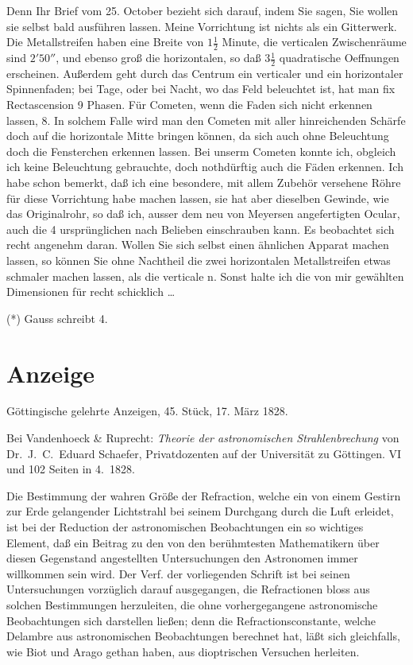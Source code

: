 \documentclass[12pt,a4paper]{article}
\theoremstyle{plain}
\theoremstyle{definition}
\theoremstyle{remark}
\begin{document}
\newpage

Denn Ihr Brief vom 25. October bezieht sich darauf, indem Sie sagen, Sie wollen sie selbst bald ausf\"uhren lassen. Meine Vorrichtung ist nichts als ein Gitterwerk. Die Metallstreifen haben eine Breite von $1\tfrac{1}{2}$ Minute, die verticalen Zwischenr\"aume sind $2'50''$, und ebenso gro\ss{} die horizontalen, so da\ss{} $3\tfrac{1}{2}$ quadratische Oeffnungen erscheinen. Au\ss erdem geht durch das Centrum ein verticaler und ein horizontaler Spinnenfaden; bei Tage, oder bei Nacht, wo das Feld beleuchtet ist, hat man fix Rectascension 9 Phasen. F\"ur Cometen, wenn die Faden sich nicht erkennen lassen, 8. In solchem Falle wird man den Cometen mit aller hinreichenden Sch\"arfe doch auf die horizontale Mitte bringen k\"onnen, da sich auch ohne Beleuchtung doch die Fensterchen erkennen lassen. Bei unserm Cometen konnte ich, obgleich ich keine Beleuchtung gebrauchte, doch nothd\"urftig auch die F\"aden erkennen. Ich habe schon bemerkt, da\ss{} ich eine besondere, mit allem Zubeh\"or versehene R\"ohre f\"ur diese Vorrichtung habe machen lassen, sie hat aber dieselben Gewinde, wie das Originalrohr, so da\ss{} ich, ausser dem neu von Meyersen angefertigten Ocular, auch die 4 urspr\"unglichen nach Belieben einschrauben kann. Es beobachtet sich recht angenehm daran. Wollen Sie sich selbst einen \"ahnlichen Apparat machen lassen, so k\"onnen Sie ohne Nachtheil die zwei horizontalen Metallstreifen etwas schmaler machen lassen, als die verticale n. Sonst halte ich die von mir gew\"ahlten Dimensionen f\"ur recht schicklich \ldots\ \grqq

(*) Gauss schreibt 4.

\newpage

\section*{Anzeige}

G\"ottingische gelehrte Anzeigen, 45. St\"uck, 17. M\"arz 1828.

Bei Vandenhoeck \& Ruprecht: \emph{Theorie der astronomischen Strahlenbrechung} von Dr.\ J.\ C.\ Eduard Schaefer, Privatdozenten auf der Universit\"at zu G\"ottingen. VI und 102 Seiten in 4.\ 1828.

Die Bestimmung der wahren Gr\"o\ss e der Refraction, welche ein von einem Gestirn zur Erde gelangender Lichtstrahl bei seinem Durchgang durch die Luft erleidet, ist bei der Reduction der astronomischen Beobachtungen ein so wichtiges Element, da\ss{} ein Beitrag zu den von den ber\"uhmtesten Mathematikern \"uber diesen Gegenstand angestellten Untersuchungen den Astronomen immer willkommen sein wird. Der Verf. der vorliegenden Schrift ist bei seinen Untersuchungen vorz\"uglich darauf ausgegangen, die Refractionen bloss aus solchen Bestimmungen herzuleiten, die ohne vorhergegangene astronomische Beobachtungen sich darstellen lie\ss en; denn die Refractionsconstante, welche Delambre aus astronomischen Beobachtungen berechnet hat, l\"a\ss t sich gleichfalls, wie Biot und Arago gethan haben, aus dioptrischen Versuchen herleiten.
\end{document}
